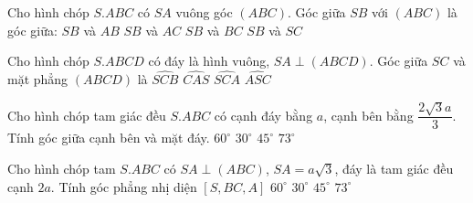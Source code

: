 \begin{ex}
Cho hình chóp $S.ABC$ có $SA$ vuông góc $(ABC)$. Góc giữa $SB$ với $(ABC)$ là góc giữa:
\choice
{\True $SB$ và $AB$}
{$SB$ và $AC$}
{$SB$ và $BC$}
{$SB$ và $SC$}
\end{ex}
\begin{ex}
Cho hình chóp $S.ABCD$ có đáy là hình vuông, $SA\perp (ABCD)$. Góc giữa $SC$ và mặt phẳng $(ABCD)$ là
\choice
{$\widehat{SCB}$}
{$\widehat{CAS}$}
{\True $\widehat{SCA}$}
{$\widehat{ASC}$}
\end{ex}
\begin{ex}
Cho hình chóp tam giác đều $S.ABC$ có cạnh đáy bằng $a$, cạnh bên bằng $\dfrac{2\sqrt{3}a}{3}$. Tính góc giữa cạnh bên và mặt đáy.
\choice
{\True ${{60}^\circ}$}
{${{30}^\circ}$}
{${{45}^\circ}$}
{${{73}^\circ}$}
\end{ex}
\begin{ex}
Cho hình chóp tam $S.ABC$ có $SA\perp  (ABC)$, $SA=a\sqrt{3}$, đáy là tam giác đều cạnh $2a$. Tính góc phẳng nhị diện $\left[S,BC,A\right]$
\choice
{${{60}^\circ}$}
{${{30}^\circ}$}
{\True ${{45}^\circ}$}
{${{73}^\circ}$}
\end{ex}



